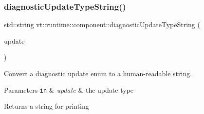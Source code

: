 \subsubsection{\texorpdfstring{diagnostic\+Update\+Type\+String()}{diagnosticUpdateTypeString()}}
{\footnotesize\ttfamily std\+::string vt\+::runtime\+::component\+::diagnostic\+Update\+Type\+String (\begin{DoxyParamCaption}\item[{\hyperlink{namespacevt_1_1runtime_1_1component_a896637e6e183a909a17bfd8d3943c206}{Diagnostic\+Update}}]{update }\end{DoxyParamCaption})}



Convert a diagnostic update enum to a human-\/readable string. 


\begin{DoxyParams}[1]{Parameters}
\mbox{\tt in}  & {\em update} & the update type\\
\hline
\end{DoxyParams}
\begin{DoxyReturn}{Returns}
a string for printing 
\end{DoxyReturn}
